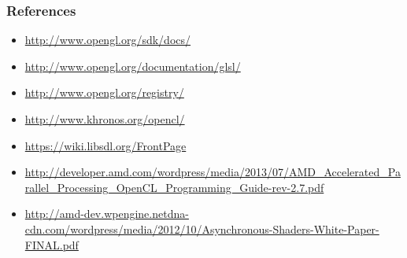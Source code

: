 \begin{frame}
  \frametitle{References}
  \begin{itemize}
    \item \url{http://www.opengl.org/sdk/docs/}
    \item \url{http://www.opengl.org/documentation/glsl/}
    \item \url{http://www.opengl.org/registry/}
    \item \url{http://www.khronos.org/opencl/}
    \item \url{https://wiki.libsdl.org/FrontPage}
    \item \url{http://developer.amd.com/wordpress/media/2013/07/AMD_Accelerated_Parallel_Processing_OpenCL_Programming_Guide-rev-2.7.pdf}
    \item \url{http://amd-dev.wpengine.netdna-cdn.com/wordpress/media/2012/10/Asynchronous-Shaders-White-Paper-FINAL.pdf}
  \end{itemize}
\end{frame}

